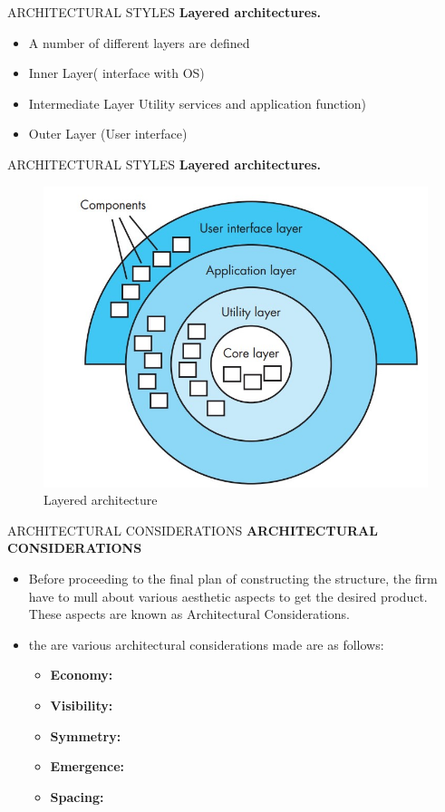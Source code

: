 \documentclass{beamer}
\begin{document}
\begin{frame}{ARCHITECTURAL STYLES}
	\textbf{Layered architectures. }
	\begin{itemize}
		\item A number of different layers are defined
		\item Inner Layer( interface with OS)
		\item Intermediate Layer Utility services and application function)
		\item Outer Layer (User interface)
	\end{itemize}
\end{frame}

\begin{frame}{ARCHITECTURAL STYLES}
	\textbf{Layered architectures. }
\begin{figure}
	\includegraphics[scale=.45]{img/m2_39.jpg}
	\caption{Layered 
		architecture }
\end{figure}
\end{frame}
\begin{frame}{ARCHITECTURAL CONSIDERATIONS}
	\textbf{ARCHITECTURAL CONSIDERATIONS}
	\begin{itemize}
		\item Before proceeding to the final plan of constructing the structure, the firm have to mull about various aesthetic aspects to get the desired product. These aspects are known as Architectural Considerations.
		\item the are various architectural considerations made are as follows:
		\begin{itemize}
		\item \textbf{Economy:} 
		
		\item \textbf{Visibility:} 
		\item \textbf{Symmetry:} 
		
		\item \textbf{Emergence:} 
		\item \textbf{Spacing:}
		\end{itemize}
	\end{itemize}
\end{frame}
\end{document}

